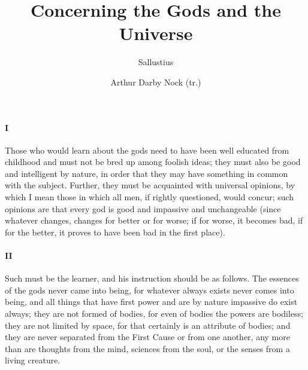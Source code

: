 \documentclass[12pt]{article}
\title{Concerning the Gods and the Universe}
\author{Sallustius \and Arthur Darby Nock (tr.)}
\date{}
\begin{document}
\maketitle

\paragraph{I} Those who would learn about the gods need to have been well
educated from childhood and must not be bred up among foolish ideas; they must
also be good and intelligent by nature, in order that they may have something
in common with the subject. Further, they must be acquainted with universal
opinions, by which I mean those in which all men, if rightly questioned, would
concur; such opinions are that every god is good and impassive and unchangeable
(since whatever changes, changes for better or for worse; if for worse, it
becomes bad, if for the better, it proves to have been bad in the first place).

\paragraph{II} Such must be the learner, and his instruction should be as
follows. The essences of the gods never came into being, for whatever always
exists never comes into being, and all things that have first power and are by
nature impassive do exist always; they are not formed of bodies, for even of
bodies the powers are bodiless; they are not limited by space, for that
certainly is an attribute of bodies; and they are never separated from the
First Cause or from one another, any more than are thoughts from the mind,
sciences from the soul, or the senses from a living creature.
\end{document}
